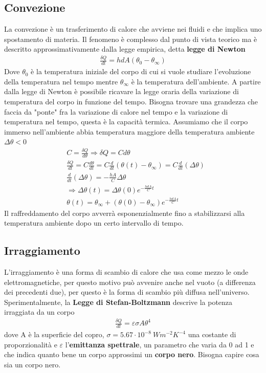 \documentclass[10pt,a4paper]{article}
\begin{document}
\subsection{Convezione}
La convezione è un trasferimento di calore che avviene nei fluidi e che implica uno spostamento di materia. Il fenomeno è complesso dal punto di vista teorico ma è descritto approssimativamente dalla legge empirica, detta \textbf{legge di Newton}
\begin{align*}
	\frac{\delta Q}{dt} = h dA (\theta_0-\theta_{\infty})
\end{align*}
Dove $\theta_0$ è la temperatura iniziale del corpo di cui si vuole studiare l'evoluzione della temperatura nel tempo mentre $\theta_{\infty}$ è la temperatura dell'ambiente. A partire dalla legge di Newton è possibile ricavare la legge oraria della variazione di temperatura del corpo in funzione del tempo. Bisogna trovare una grandezza che faccia da "ponte" fra la variazione di calore nel tempo e la variazione di temperatura nel tempo, questa è la capacità termica. Assumiamo che il corpo immerso nell'ambiente abbia temperatura maggiore della temperatura ambiente \(\Delta\theta < 0\)
\begin{align*}
	&C = \frac{\delta Q}{d\theta} \Rightarrow \delta Q = C d\theta\\
	&\frac{\delta Q }{dt} =C \frac{d\theta}{dt}=C \frac{d}{dt}(\theta(t)-\theta_{\infty}) = C \frac{d}{dt} (\Delta\theta)\\
	&\frac{d}{dt} (\Delta\theta) = -\frac{h A}{C}\Delta\theta\\
	&\Rightarrow\Delta\theta(t) =  \Delta\theta(0) e^{-\frac{h dA }{C}t}\\
	&\theta(t) = \theta_{\infty} + (\theta(0)-\theta_{\infty}) e^{-\frac{h dA }{C}t}
\end{align*} 
Il raffreddamento del corpo avverrà esponenzialmente fino a stabilizzarsi alla temperatura ambiente dopo un certo intervallo di tempo. 
\subsection{Irraggiamento}
L'irraggiamento è una forma di scambio di calore che usa come mezzo le onde elettromagnetiche, per questo motivo può avvenire anche nel vuoto (a differenza dei precedenti due), per questo è la forma di scambio più diffusa nell'universo. Sperimentalmente, la \textbf{Legge di Stefan-Boltzmann} descrive la potenza irraggiata da un corpo
\begin{align*}
	\frac{\delta Q }{dt} = \varepsilon \sigma A \theta^4
\end{align*}
dove A è la superficie del copro, \(\sigma = 5.67 \cdot 10^{-8}\ W m^{-2}K^{-4}\) una costante di proporzionalità e $\varepsilon$ l'\textbf{emittanza spettrale}, un parametro che varia da 0 ad 1 e che indica quanto bene un corpo approssimi un \textbf{corpo nero}. Bisogna capire cosa sia un corpo nero. 
\end{document}
